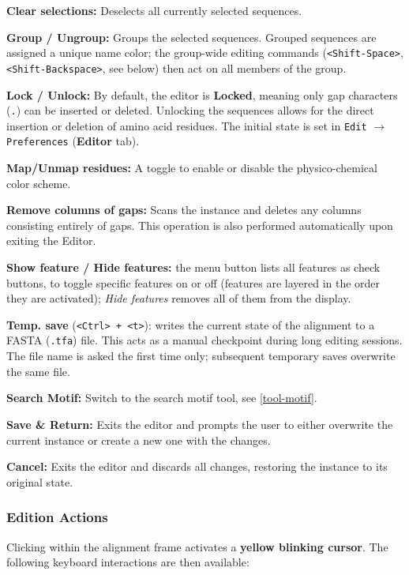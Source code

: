 \documentclass[a4paper]{article}
\begin{document}
\begin{description}
\item \textbf{Clear selections:} Deselects all currently selected sequences.
    \item \textbf{Group / Ungroup:} Groups the selected sequences. Grouped sequences are assigned a unique name color; the group-wide editing commands (\texttt{<Shift-Space>}, \texttt{<Shift-Backspace>}, see below) then act on all members of the group.
    \item \textbf{Lock / Unlock:} By default, the editor is \textbf{Locked}, meaning only gap characters (\texttt{.}) can be inserted or deleted. Unlocking the sequences allows for the direct insertion or deletion of amino acid residues. The initial state is set in \texttt{Edit} $\rightarrow$ \texttt{Preferences} (\textbf{Editor} tab).
    \item \textbf{Map/Unmap residues:} A toggle to enable or disable the physico-chemical color scheme.
    \item \textbf{Remove columns of gaps:} Scans the instance and deletes any columns consisting entirely of gaps. This operation is also performed automatically upon exiting the Editor.
    \item \textbf{Show feature / Hide features:} the menu button lists all features as check buttons, to toggle specific features on or off (features are layered in the order they are activated); \textit{Hide features} removes all of them from the display.
    \item \textbf{Temp. save} (\texttt{<Ctrl> + <t>}): writes the current state of the alignment to a FASTA (\texttt{.tfa}) file. This acts as a manual checkpoint during long editing sessions. The file name is asked the first time only; subsequent temporary saves overwrite the same file.
    \item \textbf{Search Motif:} Switch to the search motif tool, see \ref{tool-motif}.
    \item \textbf{Save \& Return:} Exits the editor and prompts the user to either overwrite the current instance or create a new one with the changes.
    \item \textbf{Cancel:} Exits the editor and discards all changes, restoring the instance to its original state.
\end{description}

\subsubsection{Edition Actions}
Clicking within the alignment frame activates a \textbf{yellow blinking cursor}. The following keyboard interactions are then available:
\end{document}

